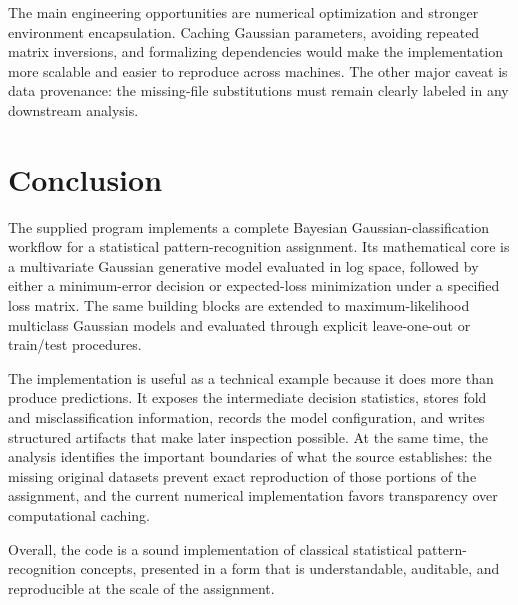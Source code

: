 \documentclass[11pt,a4paper]{article}
\begin{document}
The main engineering opportunities are numerical optimization and stronger environment encapsulation. Caching Gaussian parameters, avoiding repeated matrix inversions, and formalizing dependencies would make the implementation more scalable and easier to reproduce across machines. The other major caveat is data provenance: the missing-file substitutions must remain clearly labeled in any downstream analysis.

\section{Conclusion}
The supplied program implements a complete Bayesian Gaussian-classification workflow for a statistical pattern-recognition assignment. Its mathematical core is a multivariate Gaussian generative model evaluated in log space, followed by either a minimum-error decision or expected-loss minimization under a specified loss matrix. The same building blocks are extended to maximum-likelihood multiclass Gaussian models and evaluated through explicit leave-one-out or train/test procedures.

The implementation is useful as a technical example because it does more than produce predictions. It exposes the intermediate decision statistics, stores fold and misclassification information, records the model configuration, and writes structured artifacts that make later inspection possible. At the same time, the analysis identifies the important boundaries of what the source establishes: the missing original datasets prevent exact reproduction of those portions of the assignment, and the current numerical implementation favors transparency over computational caching.

Overall, the code is a sound implementation of classical statistical pattern-recognition concepts, presented in a form that is understandable, auditable, and reproducible at the scale of the assignment.
\end{document}
